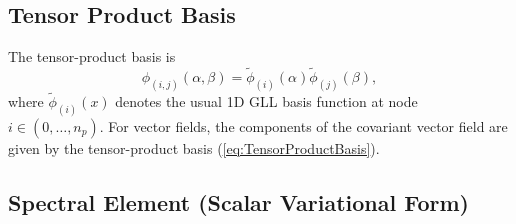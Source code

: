 \documentclass{article}
\begin{document}
\subsection{Tensor Product Basis}

The tensor-product basis is
\begin{equation} \label{eq:TensorProductBasis}
\phi_{(i,j)}(\alpha, \beta) = \tilde{\phi}_{(i)}(\alpha) \tilde{\phi}_{(j)}(\beta),
\end{equation} where $\tilde{\phi}_{(i)}(x)$ denotes the usual 1D GLL basis function at node $i \in (0, \ldots, n_p)$.  For vector fields, the components of the covariant vector field are given by the tensor-product basis (\ref{eq:TensorProductBasis}).

\subsection{Spectral Element (Scalar Variational Form)}
\end{document}
